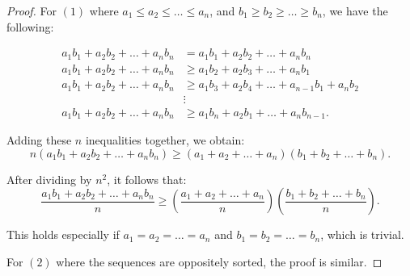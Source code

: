 \begin{proof}
    For \( (1) \) where \( a_1 \leq a_2 \leq \ldots \leq a_n \), and \( b_1 \geq b_2 \geq \ldots \geq b_n \), we have the following:

\begin{align*}
    a_1b_1 + a_2b_2 + \ldots + a_nb_n &= a_1b_1 + a_2b_2 + \ldots + a_nb_n \\
    a_1b_1 + a_2b_2 + \ldots + a_nb_n &\geq a_1b_2 + a_2b_3 + \ldots + a_nb_1 \\
    a_1b_1 + a_2b_2 + \ldots + a_nb_n &\geq a_1b_3 + a_2b_4 + \ldots + a_{n-1}b_1 + a_nb_2 \\
    &\vdots \\
    a_1b_1 + a_2b_2 + \ldots + a_nb_n &\geq a_1b_n + a_2b_1 + \ldots + a_nb_{n-1}.
\end{align*}

Adding these \( n \) inequalities together, we obtain:
\[ n(a_1b_1 + a_2b_2 + \ldots + a_nb_n) \geq (a_1 + a_2 + \ldots + a_n)(b_1 + b_2 + \ldots + b_n). \]

After dividing by \( n^2 \), it follows that:
\[ \frac{a_1b_1 + a_2b_2 + \ldots + a_nb_n}{n} \geq \left( \frac{a_1 + a_2 + \ldots + a_n}{n} \right)\left( \frac{b_1 + b_2 + \ldots + b_n}{n} \right). \]

This holds especially if \( a_1 = a_2 = \ldots = a_n \) and \( b_1 = b_2 = \ldots = b_n \), which is trivial.

For \( (2) \) where the sequences are oppositely sorted, the proof is similar.
\end{proof}

